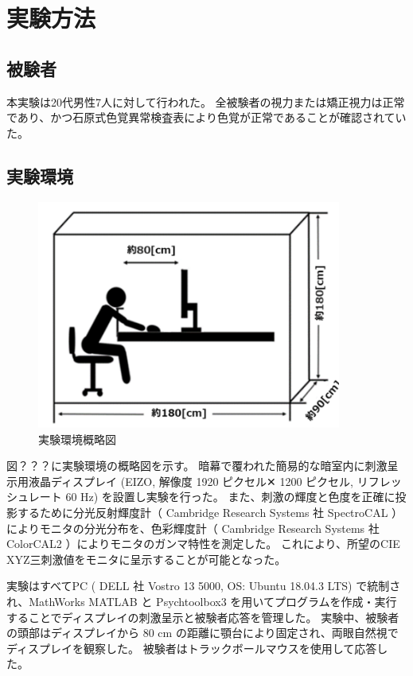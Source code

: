 \section{実験方法}
    \subsection{被験者}
        本実験は20代男性7人に対して行われた。
        全被験者の視力または矯正視力は正常であり、かつ石原式色覚異常検査表により色覚が正常であることが確認されていた。

    \subsection{実験環境}

        \begin{figure}[h]
            \centering
            \includegraphics[width=10.0cm]{./img/darkroom_p.png}
            \caption{実験環境概略図}
            \label{darkroom}
        \end{figure}

        図？？？に実験環境の概略図を示す。
        暗幕で覆われた簡易的な暗室内に刺激呈示用液晶ディスプレイ (EIZO, 解像度 1920 ピクセル✕ 1200 ピクセル, リフレッシュレート 60 Hz) を設置し実験を行った。
        また、刺激の輝度と色度を正確に投影するために分光反射輝度計（ Cambridge Research Systems 社 SpectroCAL ） によりモニタの分光分布を、色彩輝度計（ Cambridge Research Systems 社 ColorCAL2 ）によりモニタのガンマ特性を測定した。
        これにより、所望のCIE XYZ三刺激値をモニタに呈示することが可能となった。
        
        実験はすべてPC ( DELL 社 Vostro 13 5000, OS: Ubuntu 18.04.3 LTS) で統制され、MathWorks MATLAB と Psychtoolbox3 を用いてプログラムを作成・実行することでディスプレイの刺激呈示と被験者応答を管理した。
        実験中、被験者の頭部はディスプレイから 80 cm の距離に顎台により固定され、両眼自然視でディスプレイを観察した。
        被験者はトラックボールマウスを使用して応答した。


